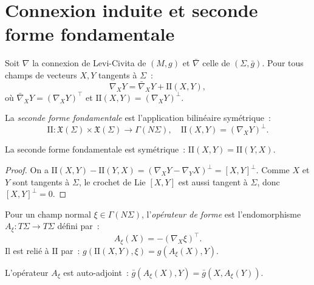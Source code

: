 \section{Connexion induite et seconde forme fondamentale}

\begin{definition}
Soit $\nabla$ la connexion de Levi-Civita de $(M, g)$ et $\bar{\nabla}$ celle de
$(\Sigma, \bar{g})$. Pour tous champs de vecteurs $X, Y$ tangents \`a $\Sigma$~:
\[
    \nabla_X Y = \bar{\nabla}_X Y + \mathrm{I\!I}(X, Y),
\]
o\`u $\bar{\nabla}_X Y = (\nabla_X Y)^\top$ et $\mathrm{I\!I}(X, Y) = (\nabla_X Y)^\perp$.
\end{definition}

\begin{definition}
La \emph{seconde forme fondamentale} est l'application bilin\'eaire sym\'etrique~:
\[
    \mathrm{I\!I} : \mathfrak{X}(\Sigma) \times \mathfrak{X}(\Sigma) \to \Gamma(N\Sigma),
    \quad \mathrm{I\!I}(X, Y) = (\nabla_X Y)^\perp.
\]
\end{definition}

\begin{proposition}
La seconde forme fondamentale est sym\'etrique~: $\mathrm{I\!I}(X, Y) = \mathrm{I\!I}(Y, X)$.
\end{proposition}

\begin{proof}
On a $\mathrm{I\!I}(X, Y) - \mathrm{I\!I}(Y, X) = (\nabla_X Y - \nabla_Y X)^\perp
= [X, Y]^\perp$. Comme $X$ et $Y$ sont tangents \`a $\Sigma$, le crochet de Lie
$[X, Y]$ est aussi tangent \`a $\Sigma$, donc $[X, Y]^\perp = 0$.
\end{proof}

\begin{definition}
Pour un champ normal $\xi \in \Gamma(N\Sigma)$, l'\emph{op\'erateur de forme}
est l'endomorphisme $A_\xi : T\Sigma \to T\Sigma$ d\'efini par~:
\[
    A_\xi(X) = -(\nabla_X \xi)^\top.
\]
Il est reli\'e \`a $\mathrm{I\!I}$ par~:
$g(\mathrm{I\!I}(X, Y), \xi) = g(A_\xi(X), Y)$.
\end{definition}

\begin{proposition}
L'op\'erateur $A_\xi$ est auto-adjoint~:
$\bar{g}(A_\xi(X), Y) = \bar{g}(X, A_\xi(Y))$.
\end{proposition}

